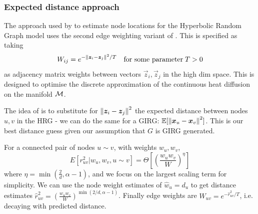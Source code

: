 \subsubsection{Expected distance approach}
The approach used by \cite{garcia2019mercator} to estimate node locations for the Hyperbolic Random Graph model uses the second  edge weighting variant of \cite{belkin2001laplacian}. This is specified as taking
\begin{equation}
  W_{ij} = e^{-\left\lVert \bm{z}_i - \bm{z}_j\right\rVert^2 / T} \quad \text{for some parameter}\; T > 0
\end{equation}
as adjacency matrix weights between vectors $\vec{z}_i, \vec{z}_j$ in the high dim space. This is designed to optimise the discrete approximation of the continuous heat diffusion on the manifold $\mathcal{M}$.

The idea of \cite{garcia2019mercator} is to substitute for $\left\lVert \bm{z}_i - \bm{z}_j\right\rVert^2$ the expected distance between nodes $u, v$ in the HRG - we can do the same for a GIRG: $\mathbb{E}[\left\lVert \bm{x}_u - \bm{x}_v\right\rVert^2]$. This is our best distance guess given our assumption that $G$ is GIRG generated.

For a connected pair of nodes $u \sim v$, with weights $w_u, w_v$,
\begin{equation}
  E[r_{uv}^2 | w_u, w_v, u \sim v] = \Theta \left [ \left ( \frac{w_u w_v}{W} \right )^\eta \right ]
\end{equation}
where $\eta = \min (\frac{2}{d}, \alpha - 1)$, and we focus on the largest scaling term for simplicity.
We can use the node weight estimates of $\hat{w}_u = d_u$ to get distance estimates $\hat{r}_{uv}^2 = \left ( \frac{w_u w_v}{W} \right )^{\min(2/d, \alpha - 1)}$. Finally edge weights are $W_{uv} = e^{-\hat{r}_{uv}^2 / T}$, i.e. decaying with predicted distance.



